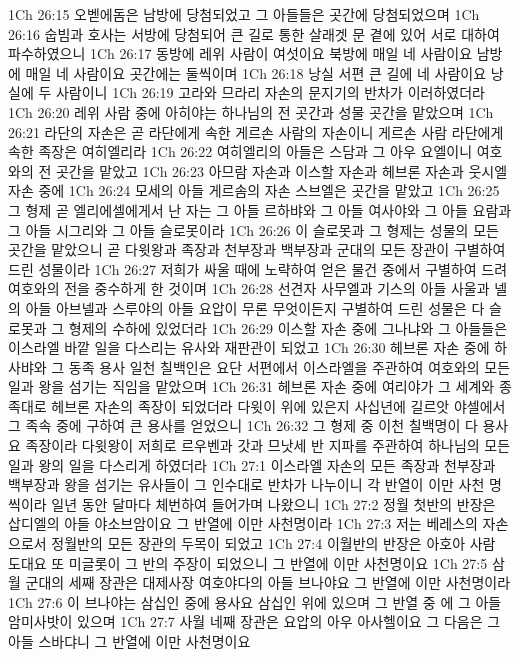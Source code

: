 1Ch 26:15  오벧에돔은 남방에 당첨되었고 그 아들들은 곳간에 당첨되었으며
1Ch 26:16  숩빔과 호사는 서방에 당첨되어 큰 길로 통한 살래겟 문 곁에 있어 서로 대하여 파수하였으니
1Ch 26:17  동방에 레위 사람이 여섯이요 북방에 매일 네 사람이요 남방에 매일 네 사람이요 곳간에는 둘씩이며
1Ch 26:18  낭실 서편 큰 길에 네 사람이요 낭실에 두 사람이니
1Ch 26:19  고라와 므라리 자손의 문지기의 반차가 이러하였더라
1Ch 26:20  레위 사람 중에 아히야는 하나님의 전 곳간과 성물 곳간을 맡았으며
1Ch 26:21  라단의 자손은 곧 라단에게 속한 게르손 사람의 자손이니 게르손 사람 라단에게 속한 족장은 여히엘리라
1Ch 26:22  여히엘리의 아들은 스담과 그 아우 요엘이니 여호와의 전 곳간을 맡았고
1Ch 26:23  아므람 자손과 이스할 자손과 헤브론 자손과 웃시엘 자손 중에
1Ch 26:24  모세의 아들 게르솜의 자손 스브엘은 곳간을 맡았고
1Ch 26:25  그 형제 곧 엘리에셀에게서 난 자는 그 아들 르하뱌와 그 아들 여사야와 그 아들 요람과 그 아들 시그리와 그 아들 슬로못이라
1Ch 26:26  이 슬로못과 그 형제는 성물의 모든 곳간을 맡았으니 곧 다윗왕과 족장과 천부장과 백부장과 군대의 모든 장관이 구별하여 드린 성물이라
1Ch 26:27  저희가 싸울 때에 노략하여 얻은 물건 중에서 구별하여 드려 여호와의 전을 중수하게 한 것이며
1Ch 26:28  선견자 사무엘과 기스의 아들 사울과 넬의 아들 아브넬과 스루야의 아들 요압이 무론 무엇이든지 구별하여 드린 성물은 다 슬로못과 그 형제의 수하에 있었더라
1Ch 26:29  이스할 자손 중에 그나냐와 그 아들들은 이스라엘 바깥 일을 다스리는 유사와 재판관이 되었고
1Ch 26:30  헤브론 자손 중에 하사뱌와 그 동족 용사 일천 칠백인은 요단 서편에서 이스라엘을 주관하여 여호와의 모든 일과 왕을 섬기는 직임을 맡았으며
1Ch 26:31  헤브론 자손 중에 여리야가 그 세계와 종족대로 헤브론 자손의 족장이 되었더라 다윗이 위에 있은지 사십년에 길르앗 야셀에서 그 족속 중에 구하여 큰 용사를 얻었으니
1Ch 26:32  그 형제 중 이천 칠백명이 다 용사요 족장이라 다윗왕이 저희로 르우벤과 갓과 므낫세 반 지파를 주관하여 하나님의 모든 일과 왕의 일을 다스리게 하였더라
1Ch 27:1  이스라엘 자손의 모든 족장과 천부장과 백부장과 왕을 섬기는 유사들이 그 인수대로 반차가 나누이니 각 반열이 이만 사천 명씩이라 일년 동안 달마다 체번하여 들어가며 나왔으니
1Ch 27:2  정월 첫반의 반장은 삽디엘의 아들 야소브암이요 그 반열에 이만 사천명이라
1Ch 27:3  저는 베레스의 자손으로서 정월반의 모든 장관의 두목이 되었고
1Ch 27:4  이월반의 반장은 아호아 사람 도대요 또 미글롯이 그 반의 주장이 되었으니 그 반열에 이만 사천명이요
1Ch 27:5  삼월 군대의 세째 장관은 대제사장 여호야다의 아들 브나야요 그 반열에 이만 사천명이라
1Ch 27:6  이 브나야는 삼십인 중에 용사요 삼십인 위에 있으며 그 반열 중 에 그 아들 암미사밧이 있으며
1Ch 27:7  사월 네째 장관은 요압의 아우 아사헬이요 그 다음은 그 아들 스바댜니 그 반열에 이만 사천명이요
